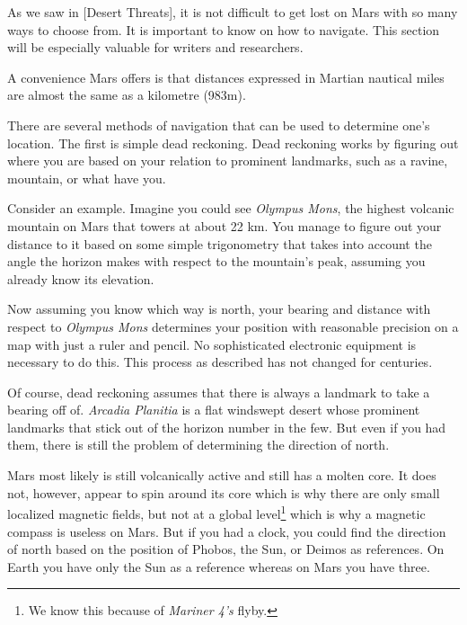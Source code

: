 

As we saw in [Desert Threats], it is not difficult to get lost on Mars with so many ways to choose from. It is important to know on how to navigate. This section will be especially valuable for writers and researchers.

A convenience Mars offers is that distances expressed in Martian nautical miles are almost the same as a kilometre (983m).

There are several methods of navigation that can be used to determine one's location. The first is simple dead reckoning. Dead reckoning works by figuring out where you are based on your relation to prominent landmarks, such as a ravine, mountain, or what have you. 

Consider an example. Imagine you could see {\it Olympus Mons}, the highest volcanic mountain on Mars that towers at about 22 km. You manage to figure out your distance to it based on some simple trigonometry that takes into account the angle the horizon makes with respect to the mountain's peak, assuming you already know its elevation. 

Now assuming you know which way is north, your bearing and distance with respect to {\it Olympus Mons} determines your position with reasonable precision on a map with just a ruler and pencil. No sophisticated electronic equipment is necessary to do this. This process as described has not changed for centuries.

Of course, dead reckoning assumes that there is always a landmark to take a bearing off of. {\it Arcadia Planitia} is a flat windswept desert whose prominent landmarks that stick out of the horizon number in the few. But even if you had them, there is still the problem of determining the direction of north. 

Mars most likely is still volcanically active and still has a molten core. It does not, however, appear to spin around its core which is why there are only small localized magnetic fields, but not at a global level\footnote{We know this because of {\it Mariner 4's} flyby.} which is why a magnetic compass is useless on Mars. But if you had a clock, you could find the direction of north based on the position of Phobos, the Sun, or Deimos as references. On Earth you have only the Sun as a reference whereas on Mars you have three.

